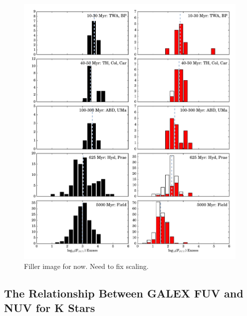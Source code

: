 \documentclass[twocolumn]{aastex62}
\begin{document}
\begin{figure}[h]
\includegraphics[width=\linewidth]{histfd_NO_J.pdf}
\caption{Filler image for now. Need to fix scaling. \label{fig:histfd}}
\end{figure}


\subsection{The Relationship Between GALEX FUV and NUV for K Stars}
\end{document}
